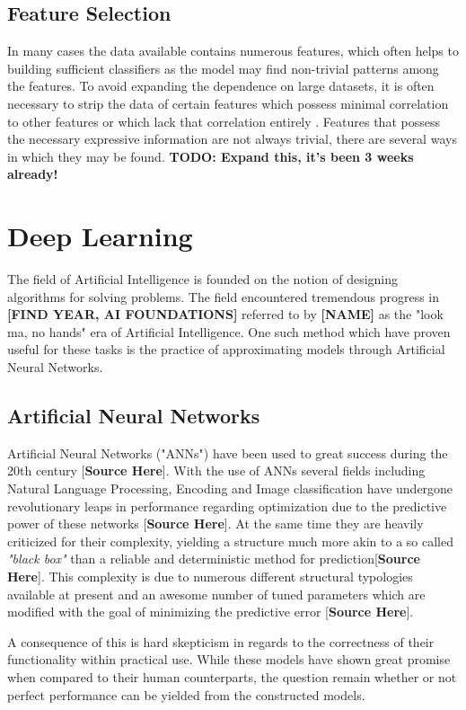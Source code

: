 \subsection{Feature Selection}

In many cases the data available contains numerous features, which often helps to building sufficient classifiers as the model may find non-trivial patterns among the features. To avoid expanding the dependence on large datasets, it is often necessary to strip the data of certain features which possess minimal correlation to other features or which lack that correlation entirely \cite{dash1997feature}. Features that possess the necessary expressive information are not always trivial, there are several ways in which they may be found. \textbf{TODO: Expand this, it's been 3 weeks already!}

\section{Deep Learning}

The field of Artificial Intelligence is founded on the notion of designing algorithms for solving problems. The field encountered tremendous progress in \textbf{[FIND YEAR, AI FOUNDATIONS]} referred to by \textbf{[NAME]} as the "look ma, no hands" era of Artificial Intelligence. One such method which have proven useful for these tasks is the practice of approximating models through Artificial Neural Networks.

\subsection{Artificial Neural Networks}
Artificial Neural Networks ("ANNs") have been used to great success during the 20th century [\textbf{Source Here}]. With the use of ANNs
several fields including Natural Language Processing, Encoding and Image classification have undergone revolutionary leaps in performance regarding optimization due to the predictive power of these networks [\textbf{Source Here}]. At the same time they are heavily criticized for their complexity, yielding a structure much more akin to a so called \textit{"black box"} than a reliable and deterministic method for prediction[\textbf{Source Here}]. This complexity is due to numerous different structural typologies available at present and an awesome number of tuned parameters which are modified with the goal of minimizing the predictive error [\textbf{Source Here}].

A consequence of this is hard skepticism in regards to the correctness of their functionality within practical use. While these models have shown great promise when compared to their human counterparts, the question remain whether or not perfect performance can be yielded from the constructed models.\\

